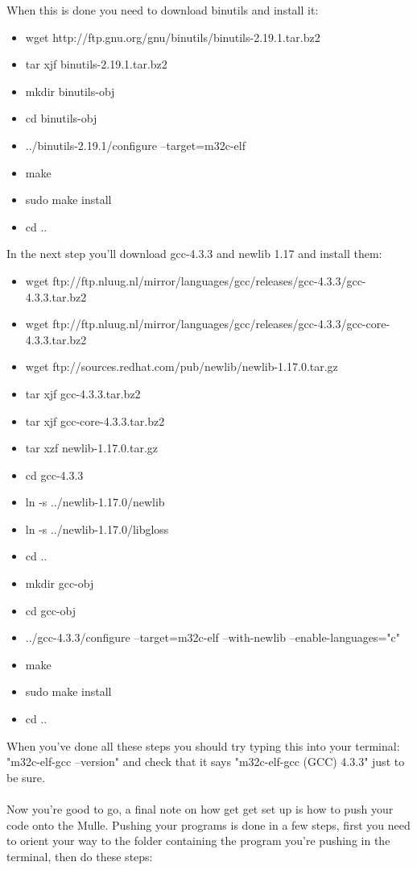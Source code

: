 \noindent When this is done you need to download binutils and install it:
\begin{itemize}
\item wget http://ftp.gnu.org/gnu/binutils/binutils-2.19.1.tar.bz2
\item tar xjf binutils-2.19.1.tar.bz2
\item mkdir binutils-obj
\item cd binutils-obj
\item ../binutils-2.19.1/configure --target=m32c-elf
\item make
\item sudo make install
\item cd ..
\end{itemize}

\noindent In the next step you'll download gcc-4.3.3 and newlib 1.17 and install them:
\begin{itemize}
\item wget ftp://ftp.nluug.nl/mirror/languages/gcc/releases/gcc-4.3.3/gcc-4.3.3.tar.bz2
\item wget ftp://ftp.nluug.nl/mirror/languages/gcc/releases/gcc-4.3.3/gcc-core-4.3.3.tar.bz2
\item wget ftp://sources.redhat.com/pub/newlib/newlib-1.17.0.tar.gz
\item tar xjf gcc-4.3.3.tar.bz2
\item tar xjf gcc-core-4.3.3.tar.bz2
\item tar xzf newlib-1.17.0.tar.gz
\item cd gcc-4.3.3
\item ln -s ../newlib-1.17.0/newlib
\item ln -s ../newlib-1.17.0/libgloss
\item cd ..
\item mkdir gcc-obj
\item cd gcc-obj
\item ../gcc-4.3.3/configure --target=m32c-elf --with-newlib --enable-languages="c"
\item make
\item sudo make install
\item cd ..
\end{itemize}
When you've done all these steps you should try typing this into your terminal: "m32c-elf-gcc --version" and check that it says "m32c-elf-gcc (GCC) 4.3.3" just to be sure.
\\\\
Now you're good to go, a final note on how get get set up is how to push your code onto the Mulle. Pushing your programs is done in a few steps, first you need to orient your way to the folder containing the program you're pushing in the terminal, then do these steps:
